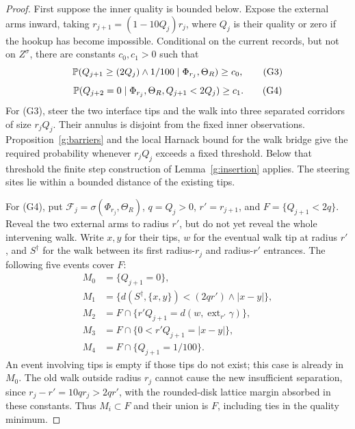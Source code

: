 \begin{proof}
First suppose the inner quality is bounded below. Expose the external
arms inward, taking \(r_{j+1}=(1-10Q_j)r_j\), where \(Q_j\) is their
quality or zero if the hookup has become impossible. Conditional on
the current records, but not on \(Z^\sigma\), there are constants
\(c_0,c_1>0\) such that
\[
 \mathbb P(Q_{j+1}\geq(2Q_j)\wedge 1/100\mid\Phi_{r_j},\Theta_R)
       \geq c_0,
 \tag{G3}
\]
\[
 \mathbb P(Q_{j+2}=0\mid\Phi_{r_j},\Theta_R,Q_{j+1}<2Q_j)
       \geq c_1. \tag{G4}
\]
For (G3), steer the two interface tips and the walk into three separated
corridors of size \(r_jQ_j\). Their annulus is disjoint from the fixed
inner observations. Proposition~\ref{g:barriers} and the local Harnack
bound for the walk bridge give the required probability whenever
\(r_jQ_j\) exceeds a fixed threshold. Below that threshold the finite
step construction of Lemma~\ref{g:insertion} applies. The steering
sites lie within a bounded distance of the existing tips.

For (G4), put \(\mathcal F_j=\sigma(\Phi_{r_j},\Theta_R)\),
\(q=Q_j>0\), \(r'=r_{j+1}\), and
\(F=\{Q_{j+1}<2q\}\). Reveal the two external arms to radius \(r'\),
but do not yet reveal the whole intervening walk. Write \(x,y\) for
their tips, \(w\) for the eventual walk tip at radius \(r'\), and
\(S^\dagger\) for the walk between its first radius-\(r_j\) and
radius-\(r'\) entrances. The following five events cover \(F\):
\[
\begin{split}
 M_0&=\{Q_{j+1}=0\},\\
 M_1&=\{d(S^\dagger,\{x,y\})<(2q r')\wedge|x-y|\},\\
 M_2&=F\cap\{r'Q_{j+1}=d(w,\operatorname{ext}_{r'}\gamma)\},\\
 M_3&=F\cap\{0<r'Q_{j+1}=|x-y|\},\\
 M_4&=F\cap\{Q_{j+1}=1/100\}.
\end{split}                                                    \tag{G4a}
\]
An event involving tips is empty if those tips do not exist; this
case is already in \(M_0\). The old walk outside radius \(r_j\)
cannot cause the new insufficient separation, since
\(r_j-r'=10q r_j>2q r'\), with the rounded-disk lattice margin
absorbed in these constants. Thus \(M_i\subset F\) and their union
is \(F\), including ties in the quality minimum.


\end{proof}
